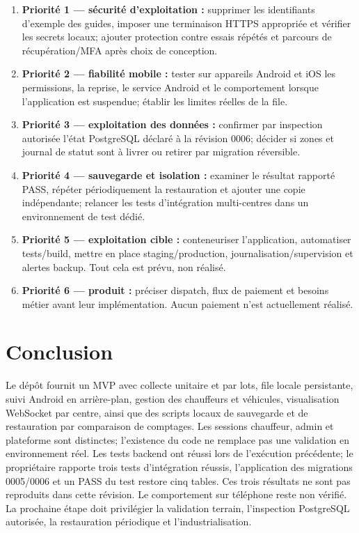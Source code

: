 \documentclass[12pt,a4paper]{article}
\begin{document}
\begin{enumerate}
\item \textbf{Priorité 1 — sécurité d'exploitation :} supprimer les identifiants d'exemple des guides, imposer une terminaison HTTPS appropriée et vérifier les secrets locaux; ajouter protection contre essais répétés et parcours de récupération/MFA après choix de conception.
\item \textbf{Priorité 2 — fiabilité mobile :} tester sur appareils Android et iOS les permissions, la reprise, le service Android et le comportement lorsque l'application est suspendue; établir les limites réelles de la file.
\item \textbf{Priorité 3 — exploitation des données :} confirmer par inspection autorisée l'état PostgreSQL déclaré à la révision 0006; décider si zones et journal de statut sont à livrer ou retirer par migration réversible.
\item \textbf{Priorité 4 — sauvegarde et isolation :} examiner le résultat rapporté PASS, répéter périodiquement la restauration et ajouter une copie indépendante; relancer les tests d'intégration multi-centres dans un environnement de test dédié.
\item \textbf{Priorité 5 — exploitation cible :} conteneuriser l'application, automatiser tests/build, mettre en place staging/production, journalisation/supervision et alertes backup. Tout cela est prévu, non réalisé.
\item \textbf{Priorité 6 — produit :} préciser dispatch, flux de paiement et besoins métier avant leur implémentation. Aucun paiement n'est actuellement réalisé.
\end{enumerate}

\section{Conclusion}

Le dépôt fournit un MVP avec collecte unitaire et par lots, file locale persistante, suivi Android en arrière-plan, gestion des chauffeurs et véhicules, visualisation WebSocket par centre, ainsi que des scripts locaux de sauvegarde et de restauration par comparaison de comptages. Les sessions chauffeur, admin et plateforme sont distinctes; l'existence du code ne remplace pas une validation en environnement réel. Les tests backend ont réussi lors de l'exécution précédente; le propriétaire rapporte trois tests d'intégration réussis, l'application des migrations 0005/0006 et un PASS du test restore cinq tables. Ces trois résultats ne sont pas reproduits dans cette révision. Le comportement sur téléphone reste non vérifié. La prochaine étape doit privilégier la validation terrain, l'inspection PostgreSQL autorisée, la restauration périodique et l'industrialisation.
\end{document}
